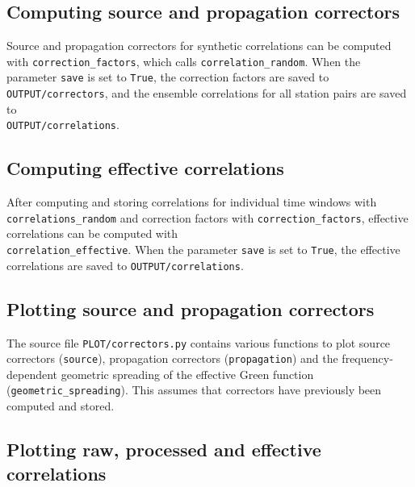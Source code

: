 \subsection{Computing source and propagation correctors}

Source and propagation correctors for synthetic correlations can be computed with \texttt{correction\_factors}, which calls \texttt{correlation\_random}. When the parameter \texttt{save} is set to \texttt{True}, the correction factors are saved to \texttt{OUTPUT/correctors}, and the ensemble correlations for all station pairs are saved to\\
 \texttt{OUTPUT/correlations}.
 
\subsection{Computing effective correlations}

After computing and storing correlations for individual time windows with \texttt{correlations\_random} and correction factors with \texttt{correction\_factors}, effective correlations can be computed with\\
\texttt{correlation\_effective}. When the parameter \texttt{save} is set to \texttt{True}, the effective correlations are saved to \texttt{OUTPUT/correlations}.

\subsection{Plotting source and propagation correctors}

The source file \texttt{PLOT/correctors.py} contains various functions to plot source correctors (\texttt{source}), propagation correctors (\texttt{propagation}) and the frequency-dependent geometric spreading of the effective Green function (\texttt{geometric\_spreading}). This assumes that correctors have previously been computed and stored.

\subsection{Plotting raw, processed and effective correlations}


